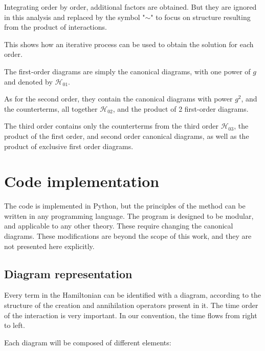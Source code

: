 \documentclass[11pt,a4paper,twoside,pdf]{article}
\numberwithin{equation}{section}
\begin{document}
Integrating order by order, additional factors are obtained. But they are ignored
in this analysis and replaced by the symbol "$\sim$" to focus on structure 
resulting from the product of interactions.

This shows how an iterative 
process can be used to obtain the solution for each order.

The first-order diagrams are simply the canonical diagrams, with one power of $g$ 
and denoted by $\mathcal{H}_{01}$. 

As for the second order, 
they contain the canonical diagrams with power $g^2$, and the counterterms,
all together $\mathcal{H}_{02}$, and the product of 2 first-order diagrams. 

The 
third order contains only the counterterms from the third order $\mathcal{H}_{03}$,
the product of the first order, and second order canonical diagrams, as well as the 
product of exclusive first order diagrams.

\newpage


\section{Code implementation} \label{sec:code}

The code is implemented in Python, but the principles of the method can be written in any 
programming language. The program is designed to be modular, and applicable to any
other theory. These require changing the canonical
diagrams. These modifications are beyond the scope of this work, and they are not presented
here explicitly.


\subsection{Diagram representation}

Every term in the Hamiltonian can be identified with a diagram, according to the 
structure of the creation and annihilation operators present in it.
The time order of the interaction is very important. In our convention, the time flows from right to left.

Each diagram 
will be composed of different elements:
\end{document}
